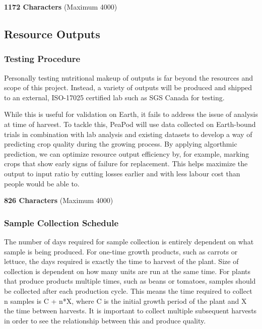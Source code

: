 \textbf{1172 Characters} (Maximum 4000)

\clearpage

\subsection{Resource Outputs}

\subsubsection{Testing Procedure}

Personally testing nutritional makeup of outputs is far beyond the resources and scope of this project. Instead, a variety of outputs will be produced and shipped to an external, ISO-17025 certified lab such as SGS Canada for testing.

While this is useful for validation on Earth, it fails to address the issue of analysis at time of harvest. To tackle this, PeaPod will use data collected on Earth-bound trials in combination with lab analysis and existing datasets to develop a way of predicting crop quality during the growing process. By applying algorthmic prediction, we can optimize resource output efficiency by, for example, marking crops that show early signs of failure for replacement. This helps maximize the output to input ratio by cutting losses earlier and with less labour cost than people would be able to.


\textbf{826 Characters} (Maximum 4000)

\subsubsection{Sample Collection Schedule}

The number of days required for sample collection is entirely dependent on what sample is being produced. For one-time growth products, such as carrots or lettuce, the days required is exactly the time to harvest of the plant. Size of collection is dependent on how many units are run at the same time. For plants that produce products multiple times, such as beans or tomatoes, samples should be collected after each production cycle. This means the time required to collect n samples is C + n*X, where C is the initial growth period of the plant and X the time between harvests. It is important to collect multiple subsequent harvests in order to see the relationship between this and produce quality.

